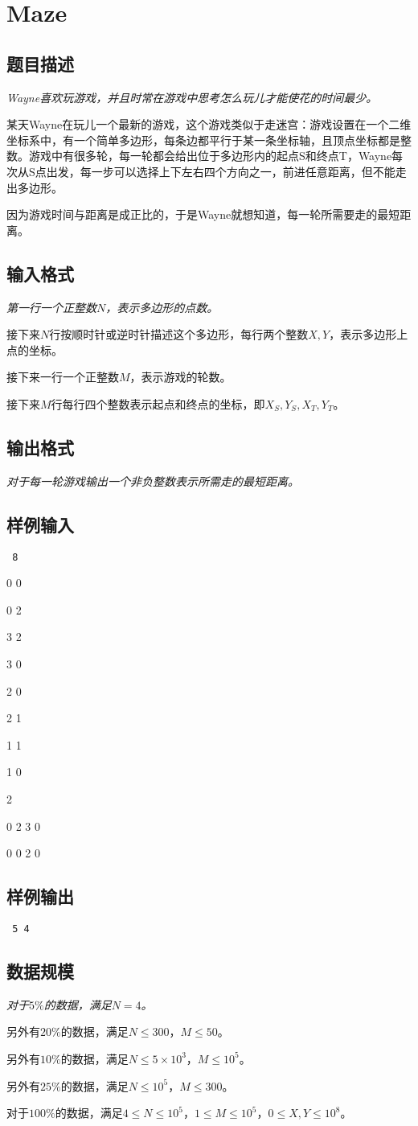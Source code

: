 \section{Maze}
\subsection{题目描述}
{\itshape
Wayne喜欢玩游戏，并且时常在游戏中思考怎么玩儿才能使花的时间最少。 \par
某天Wayne在玩儿一个最新的游戏，这个游戏类似于走迷宫：游戏设置在一个二维坐标系中，有一个简单多边形，每条边都平行于某一条坐标轴，且顶点坐标都是整数。游戏中有很多轮，每一轮都会给出位于多边形内的起点S和终点T，Wayne每次从S点出发，每一步可以选择上下左右四个方向之一，前进任意距离，但不能走出多边形。 \par
因为游戏时间与距离是成正比的，于是Wayne就想知道，每一轮所需要走的最短距离。
}
\subsection{输入格式}
{\itshape
第一行一个正整数$N$，表示多边形的点数。 \par
接下来$N$行按顺时针或逆时针描述这个多边形，每行两个整数$X,Y$，表示多边形上点的坐标。 \par
接下来一行一个正整数$M$，表示游戏的轮数。 \par
接下来$M$行每行四个整数表示起点和终点的坐标，即$X_S,Y_S,X_T,Y_T$。
}
\subsection{输出格式}
{\itshape
对于每一轮游戏输出一个非负整数表示所需走的最短距离。
}
\subsection{样例输入}
{\tt
8 \par
0 0 \par
0 2 \par
3 2 \par
3 0 \par
2 0 \par
2 1 \par
1 1 \par
1 0 \par
2 \par
0 2 3 0 \par
0 0 2 0
}
\subsection{样例输出}
{\tt
5
4
}
\subsection{数据规模}
{\itshape
对于$5\%$的数据，满足$N = 4$。 \par
另外有$20\%$的数据，满足$N \le 300$，$M \le 50$。 \par
另外有$10\%$的数据，满足$N \le 5 \times 10^3$，$M \le 10^5$。 \par
另外有$25\%$的数据，满足$N \le 10^5$，$M \le 300$。 \par
对于$100\%$的数据，满足$4 \le N \le 10^5$，$1 \le M \le 10^5$，$0 \le X,Y \le 10^8$。
}
